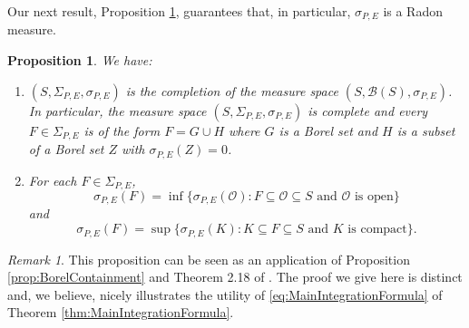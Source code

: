 \documentclass[11pt]{article}
\newtheorem{proposition}[theorem]{Proposition}
\theoremstyle{remark}
\newtheorem{remark}{Remark}
\begin{document}
\noindent Our next result, Proposition \ref{prop:Regular}, guarantees that, in particular, $\sigma_{P,E}$ is a Radon measure. 

\begin{proposition}\label{prop:Regular}
We have:
\begin{enumerate}
    \item\label{item:Complete} $(S,\Sigma_{P,E},\sigma_{P,E})$ is the completion of the measure space $(S,\mathcal{B}(S),\sigma_{P,E})$. In particular, the measure space $(S,\Sigma_{P,E},\sigma_{P,E})$ is complete and every $F\in \Sigma_{P,E}$ is of the form $F=G\cup H$ where $G$ is a Borel set and $H$ is a subset of a Borel set $Z$ with $\sigma_{P,E}(Z)=0$.
\item\label{item:Regular} For each $F\in\Sigma_{P,E}$,
\begin{equation}\label{eq:OuterRegular}
\sigma_{P,E}(F)=\inf\{\sigma_{P,E}(\mathcal{O}):F\subseteq\mathcal{O}\subseteq S\mbox{ and $\mathcal{O}$ is open}\}
\end{equation}
and
\begin{equation}
\sigma_{P,E}(F)=\sup\{\sigma_{P,E}(K):K\subseteq F\subseteq S\mbox{ and $K$ is compact}\}.
\end{equation}
\end{enumerate} 
\end{proposition}
\begin{remark}
This proposition can be seen as an application of Proposition \ref{prop:BorelContainment} and Theorem 2.18 of \cite{rudin_real_1987}. The proof we give here is distinct and, we believe, nicely illustrates the utility of \eqref{eq:MainIntegrationFormula} of Theorem \ref{thm:MainIntegrationFormula}.
\end{remark}
\end{document}
